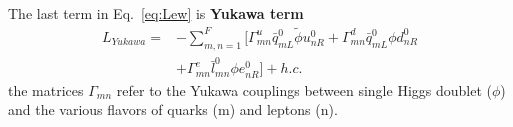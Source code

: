 The last term in Eq.~\ref{eq:Lew} is \textbf{Yukawa term}
\begin{equation}
\begin{split}
	{L}_{Yukawa} =& -\sum_{m,n=1}^{F} [\Gamma_{mn}^{u}\bar{q}_{mL}^{0}\widetilde{\phi}u_{nR}^{0} + \Gamma_{mn}^{d}\bar{q}_{mL}^{0}\phi d_{nR}^{0} \\
	& + \Gamma_{mn}^{e}\bar{l}_{mn}^{0}\phi e_{nR}^{0}]+h.c.
\end{split}
\end{equation}
the matrices $\Gamma_{mn}$ refer to the Yukawa couplings between single Higgs doublet ($\phi$) and the various flavors of quarks (m) and leptons (n).

